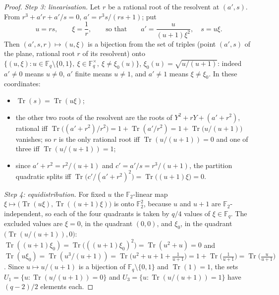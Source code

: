 \documentclass[12pt,a4paper]{amsart}
\theoremstyle{definition}
\newcommand{\F}{\mathbb{F}}
\newcommand{\Tr}{\operatorname{Tr}}
\begin{document}
\begin{proof}
\emph{Step 3: linearisation.} Let $r$ be a rational root of the resolvent at $(a',s)$. From $r^3+a'r+a'/s=0$, $a'=r^3s/(rs+1)$; put
\[
u=rs,\qquad \xi=\frac1r,\qquad\text{so that}\qquad a'=\frac u{(u+1)\xi^2},\quad s=u\xi .
\]
Then $(a',s,r)\mapsto(u,\xi)$ is a bijection from the set of triples (point $(a',s)$ of the plane, rational root $r$ of its resolvent) onto $\{(u,\xi):u\in\F_q\setminus\{0,1\},\ \xi\in\F_q^\times,\ \xi\ne\xi_0(u)\}$, $\xi_0(u)=\sqrt{u/(u+1)}$: indeed $a'\ne0$ means $u\ne0$, $a'$ finite means $u\ne1$, and $a'\ne1$ means $\xi\ne\xi_0$. In these coordinates:
\begin{itemize}[leftmargin=2em]
\item $\Tr(s)=\Tr(u\xi)$;
\item the other two roots of the resolvent are the roots of $Y^2+rY+(a'+r^2)$, rational iff $\Tr\bigl((a'+r^2)/r^2\bigr)=1+\Tr(a'/r^2)=1+\Tr\bigl(u/(u+1)\bigr)$ vanishes; so $r$ is the only rational root iff $\Tr(u/(u+1))=0$ and one of three iff $\Tr(u/(u+1))=1$;
\item since $a'+r^2=r^2/(u+1)$ and $c'=a'/s=r^3/(u+1)$, the partition quadratic splits iff $\Tr\bigl(c'/(a'+r^2)^2\bigr)=\Tr\bigl((u+1)\xi\bigr)=0$.
\end{itemize}

\emph{Step 4: equidistribution.} For fixed $u$ the $\F_2$-linear map $\xi\mapsto\bigl(\Tr(u\xi),\Tr((u+1)\xi)\bigr)$ is onto $\F_2^2$, because $u$ and $u+1$ are $\F_2$-independent, so each of the four quadrants is taken by $q/4$ values of $\xi\in\F_q$. The excluded values are $\xi=0$, in the quadrant $(0,0)$, and $\xi_0$, in the quadrant $\bigl(\Tr(u/(u+1)),0\bigr)$: $\Tr((u+1)\xi_0)=\Tr\bigl(((u+1)\xi_0)^2\bigr)=\Tr(u^2+u)=0$ and $\Tr(u\xi_0)=\Tr(u^3/(u+1))=\Tr\bigl(u^2+u+1+\tfrac1{u+1}\bigr)=1+\Tr\bigl(\tfrac1{u+1}\bigr)=\Tr\bigl(\tfrac u{u+1}\bigr)$. Since $u\mapsto u/(u+1)$ is a bijection of $\F_q\setminus\{0,1\}$ and $\Tr(1)=1$, the sets $U_1=\{u:\Tr(u/(u+1))=0\}$ and $U_3=\{u:\Tr(u/(u+1))=1\}$ have $(q-2)/2$ elements each.


\end{proof}
\end{document}
